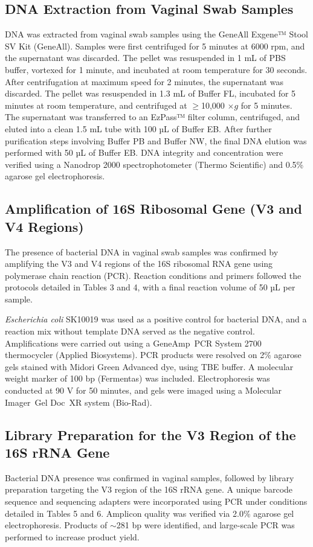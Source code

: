 \documentclass[biotech,article,submit,pdftex,moreauthors]{Definitions/mdpi}
\begin{document}
\subsection{DNA Extraction from Vaginal Swab Samples}
DNA was extracted from vaginal swab samples using the GeneAll Exgene™ Stool SV Kit (GeneAll). Samples were first centrifuged for 5 minutes at 6000 rpm, and the supernatant was discarded. The pellet was resuspended in 1 mL of PBS buffer, vortexed for 1 minute, and incubated at room temperature for 30 seconds. After centrifugation at maximum speed for 2 minutes, the supernatant was discarded. The pellet was resuspended in 1.3 mL of Buffer FL, incubated for 5 minutes at room temperature, and centrifuged at $\geq$10,000 $\times g$ for 5 minutes. The supernatant was transferred to an EzPass™ filter column, centrifuged, and eluted into a clean 1.5 mL tube with 100 µL of Buffer EB. After further purification steps involving Buffer PB and Buffer NW, the final DNA elution was performed with 50 µL of Buffer EB. DNA integrity and concentration were verified using a Nanodrop 2000 spectrophotometer (Thermo Scientific) and 0.5\% agarose gel electrophoresis.

\subsection{Amplification of 16S Ribosomal Gene (V3 and V4 Regions)}
The presence of bacterial DNA in vaginal swab samples was confirmed by amplifying the V3 and V4 regions of the 16S ribosomal RNA gene using polymerase chain reaction (PCR). Reaction conditions and primers followed the protocols detailed in Tables 3 and 4, with a final reaction volume of 50 µL per sample.

\emph{Escherichia coli} SK10019 was used as a positive control for bacterial DNA, and a reaction mix without template DNA served as the negative control. Amplifications were carried out using a GeneAmp\textregistered~PCR System 2700 thermocycler (Applied Biosystems). PCR products were resolved on 2\% agarose gels stained with Midori Green Advanced dye, using TBE buffer. A molecular weight marker of 100 bp (Fermentas\textregistered) was included. Electrophoresis was conducted at 90 V for 50 minutes, and gels were imaged using a Molecular Imager\textregistered~Gel Doc\texttrademark~XR system (Bio-Rad).

\subsection{Library Preparation for the V3 Region of the 16S rRNA Gene}
Bacterial DNA presence was confirmed in vaginal samples, followed by library preparation targeting the V3 region of the 16S rRNA gene. A unique barcode sequence and sequencing adapters were incorporated using PCR under conditions detailed in Tables 5 and 6. Amplicon quality was verified via 2.0\% agarose gel electrophoresis. Products of $\sim$281 bp were identified, and large-scale PCR was performed to increase product yield.
\end{document}
